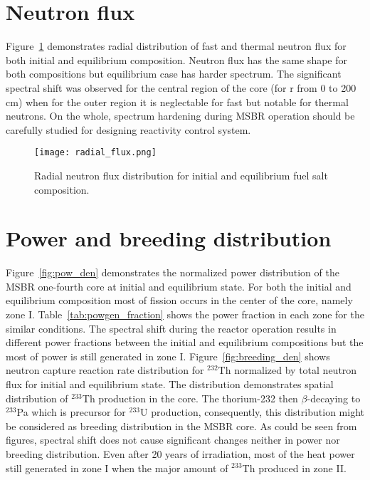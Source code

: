 \section{Neutron flux}
Figure~\ref{fig:radial_flux} demonstrates radial distribution of fast and thermal neutron flux for both initial and equilibrium composition. Neutron flux has the same shape for both compositions but equilibrium case has harder spectrum. The significant spectral shift was observed for the central region of the core (for r from 0 to 200 cm) when for the outer region it is neglectable for fast but notable for thermal neutrons. On the whole, spectrum hardening during \gls{MSBR} operation should be carefully studied for designing reactivity control system.

\begin{figure}[htp!] %
  \centering
    \vspace{-0.3em}
  \texttt{[image: radial\_flux.png]} 
  \caption{Radial neutron flux distribution for initial and equilibrium fuel salt composition.}
    \vspace{-0.6em}
  \label{fig:radial_flux}
\end{figure}
\FloatBarrier

\section{Power and breeding distribution}
Figure~\ref{fig:pow_den} demonstrates the normalized power distribution of the \gls{MSBR} one-fourth core at initial and equilibrium state.  For both the initial and equilibrium composition most of fission occurs in the center of the core, namely zone I. Table~\ref{tab:powgen_fraction} shows the power fraction in each zone for the similar conditions. The spectral shift during the reactor operation results in different power fractions between the initial and equilibrium compositions but the most of power is still generated in zone I. Figure~\ref{fig:breeding_den} shows neutron capture reaction rate distribution for $^{232}$Th normalized by total neutron flux for initial and equilibrium state. The distribution demonstrates spatial distribution of $^{233}$Th production in the core. The thorium-232 then $\beta$-decaying to $^{233}$Pa which is precursor for $^{233}$U production, consequently, this distribution might be considered as breeding distribution in the \gls{MSBR} core. As could be seen from figures, spectral shift does not cause significant changes neither in power nor breeding distribution. Even after 20 years of irradiation, most of the heat power still generated in zone I when the major amount of $^{233}$Th produced in zone II.

